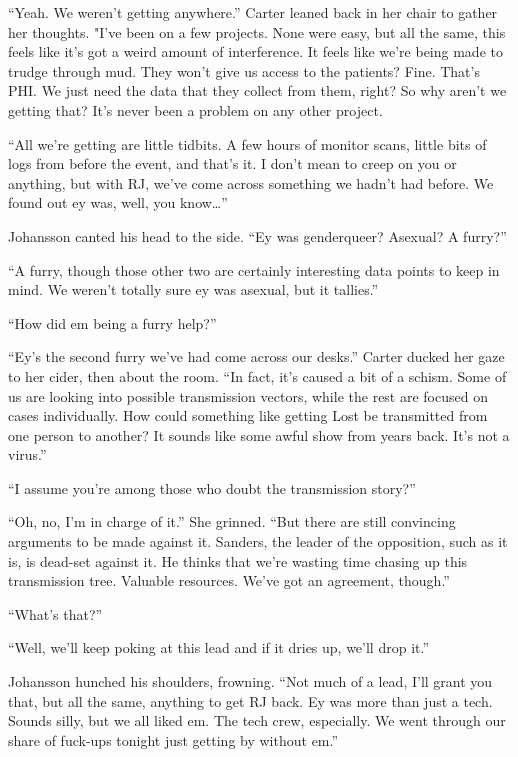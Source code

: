 ``Yeah. We weren't getting anywhere.'' Carter leaned back in her chair to gather her thoughts. "I've been on a few projects. None were easy, but all the same, this feels like it's got a weird amount of interference. It feels like we're being made to trudge through mud. They won't give us access to the patients? Fine. That's PHI. We just need the data that they collect from them, right? So why aren't we getting that? It's never been a problem on any other project.

``All we're getting are little tidbits. A few hours of monitor scans, little bits of logs from before the event, and that's it. I don't mean to creep on you or anything, but with RJ, we've come across something we hadn't had before. We found out ey was, well, you know\ldots{}''

Johansson canted his head to the side. ``Ey was genderqueer? Asexual? A furry?''

``A furry, though those other two are certainly interesting data points to keep in mind. We weren't totally sure ey was asexual, but it tallies.''

``How did em being a furry help?''

``Ey's the second furry we've had come across our desks.'' Carter ducked her gaze to her cider, then about the room. ``In fact, it's caused a bit of a schism. Some of us are looking into possible transmission vectors, while the rest are focused on cases individually. How could something like getting Lost be transmitted from one person to another? It sounds like some awful show from years back. It's not a virus.''

``I assume you're among those who doubt the transmission story?''

``Oh, no, I'm in charge of it.'' She grinned. ``But there are still convincing arguments to be made against it. Sanders, the leader of the opposition, such as it is, is dead-set against it. He thinks that we're wasting time chasing up this transmission tree. Valuable resources. We've got an agreement, though.''

``What's that?''

``Well, we'll keep poking at this lead and if it dries up, we'll drop it.''

Johansson hunched his shoulders, frowning. ``Not much of a lead, I'll grant you that, but all the same, anything to get RJ back. Ey was more than just a tech. Sounds silly, but we all liked em. The tech crew, especially. We went through our share of fuck-ups tonight just getting by without em.''

